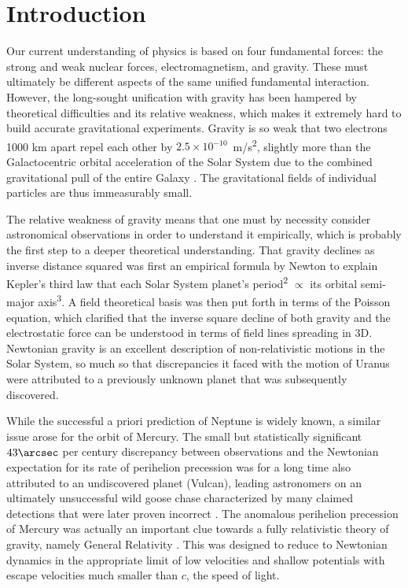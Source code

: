 \documentclass[fleqn,usenatbib,useAMS,onecolumn]{mnras} %
\begin{document}
\section{Introduction}
\label{Introduction}

Our current understanding of physics is based on four fundamental forces: the strong and weak nuclear forces, electromagnetism, and gravity. These must ultimately be different aspects of the same unified fundamental interaction. However, the long-sought unification with gravity has been hampered by theoretical difficulties and its relative weakness, which makes it extremely hard to build accurate gravitational experiments. Gravity is so weak that two electrons 1000 km apart repel each other by $2.5 \times 10^{-10}$~m/s\textsuperscript{2}, slightly more than the Galactocentric orbital acceleration of the Solar System due to the combined gravitational pull of the entire Galaxy \citep{Klioner_2021}. The gravitational fields of individual particles are thus immeasurably small.

The relative weakness of gravity means that one must by necessity consider astronomical observations in order to understand it empirically, which is probably the first step to a deeper theoretical understanding. That gravity declines as inverse distance squared was first an empirical formula by Newton to explain Kepler's third law that each Solar System planet's period\textsuperscript{2} $\propto$ its orbital semi-major axis\textsuperscript{3}. A field theoretical basis was then put forth in terms of the Poisson equation, which clarified that the inverse square decline of both gravity and the electrostatic force can be understood in terms of field lines spreading in 3D. Newtonian gravity is an excellent description of non-relativistic motions in the Solar System, so much so that discrepancies it faced with the motion of Uranus were attributed to a previously unknown planet that was subsequently discovered.

While the successful a priori prediction of Neptune is widely known, a similar issue arose for the orbit of Mercury. The small but statistically significant $43\arcsec$ per century discrepancy between observations and the Newtonian expectation for its rate of perihelion precession was for a long time also attributed to an undiscovered planet (Vulcan), leading astronomers on an ultimately unsuccessful wild goose chase characterized by many claimed detections that were later proven incorrect \citep{Levenson_2015}. The anomalous perihelion precession of Mercury was actually an important clue towards a fully relativistic theory of gravity, namely General Relativity \citep[GR;][]{Einstein_1915}. This was designed to reduce to Newtonian dynamics in the appropriate limit of low velocities and shallow potentials with escape velocities much smaller than $c$, the speed of light.
\end{document}
